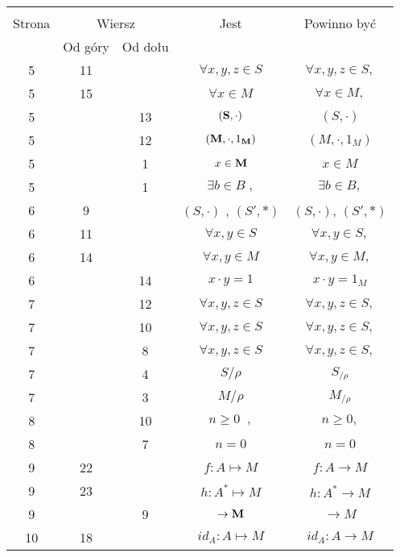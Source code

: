 \documentclass[a4paper,11pt]{article}
\begin{document}
\begin{center}

  \begin{tabular}{|c|c|c|c|c|}
    \hline
    & \multicolumn{2}{c|}{} & & \\
    Strona & \multicolumn{2}{c|}{Wiersz} & Jest
                              & Powinno być \\ \cline{2-3}
    & Od góry & Od dołu & & \\
    \hline
    5  & 11 & & $\forall x, y, z \in S$ & $\forall x, y, z \in S,$ \\
    5  & 15 & & $\forall x \in M$ & $\forall x \in M,$ \\
    5  & & 13 & $( \textrm{\textbf{S}}, \cdot )$ & $( S, \cdot )$ \\
    5  & & 12 & $( \textrm{\textbf{M}}, \cdot, 1_{ \textrm{\textbf{M}}} )$
           & $( M, \cdot, 1_{ M } )$ \\
    5  & &  1 & $x \in \textrm{\textbf{M}}$ & $x \in M$ \\
    5  & &  1 & $\exists b \in B\; ,$ & $\exists b \in B,$ \\
    6  &  9 & & $( S, \cdot )${ }, { }{ }$( S', \ast )$
           & $( S, \cdot )$, $( S', \ast )$ \\
    6  & 11 & & $\forall x, y \in S$ & $\forall x, y \in S,$ \\
    6  & 14 & & $\forall x, y \in M$ & $\forall x, y \in M,$ \\
    6  & & 14 & $x \cdot y = 1$ & $x \cdot y = 1_{ M }$ \\
    7  & & 12 & $\forall x, y, z \in S$ & $\forall x, y, z \in S,$ \\
    7  & & 10 & $\forall x, y, z \in S$ & $\forall x, y, z \in S,$ \\
    7  & &  8 & $\forall x, y, z \in S$ & $\forall x, y, z \in S,$ \\
    7  & &  4 & $S / \rho$ & $S_{ / \rho }$ \\
    7  & &  3 & $M / \rho$ & $M_{ / \rho }$ \\
    8  & & 10 & $n \geq 0\;\;,$ & $n \geq 0,$ \\
    8  & &  7 & $n \!\! = \!\! 0$ & $n = 0$ \\
    9  & 22 & & $f : A \mapsto M$ & $f : A \to M$ \\
    9  & 23 & & $h : A^{ * } \mapsto M$ & $h : A^{ * } \to M$ \\
    9  & &  9 & $\to \textrm{\textbf{M}}$ & $\to M$ \\
    10 & 18 & & $id_{ A } : A \mapsto M$ & $id_{ A } : A \to M$ \\
    \hline
  \end{tabular}

\end{center}
\end{document}
